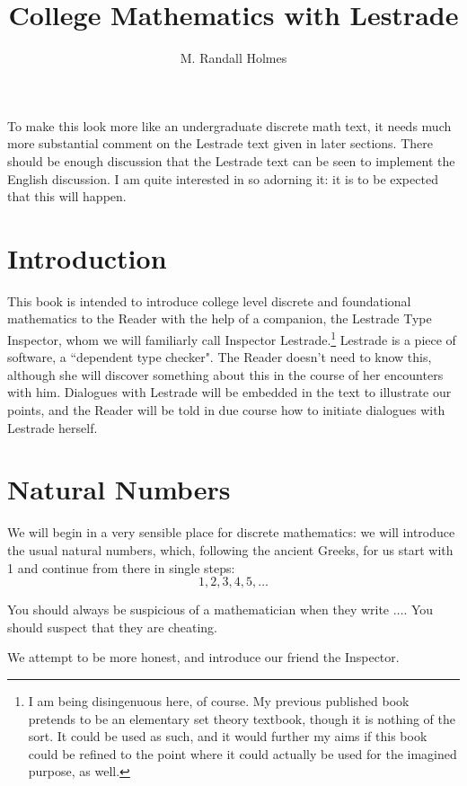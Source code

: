 \documentclass[12pt]{article}
\title{College Mathematics with Lestrade}
\author{M. Randall Holmes}
\begin{document}
\maketitle

  To make this look more like an undergraduate discrete math text, it needs much more substantial comment on the Lestrade text given in later sections.  There should be enough discussion that the Lestrade text can be seen to implement the English discussion.  I am quite interested in so adorning it:  it is to be expected that this will happen.

\section{Introduction}

This book is intended to introduce college level discrete and foundational mathematics to the Reader with the help of a companion, the Lestrade Type Inspector, whom we will familiarly call Inspector Lestrade.\footnote{I am being disingenuous here, of course.  My previous published book pretends to be an elementary set theory textbook, though it is nothing of the sort.  It could be used as such, and it would further my aims if this book could be refined to the point where it could actually be used for the imagined purpose, as well.}  Lestrade is a piece of software, a ``dependent type checker".  The Reader doesn't need to know this, although she will discover something about this in the course of her encounters with him.   Dialogues with Lestrade will be embedded in the text to illustrate our points, and the Reader will be told in due course how to initiate dialogues with Lestrade herself.

\newpage

\section{Natural Numbers}

We will begin in a very sensible place for discrete mathematics:  we will introduce the usual natural numbers, which, following the ancient Greeks, for us
start with 1 and continue from there in single steps:  $$1, 2, 3, 4, 5, \ldots$$

You should always be suspicious of a mathematician when they write $\ldots$.  You should suspect that they are cheating.

We attempt to be more honest, and introduce our friend the Inspector.
\end{document}
